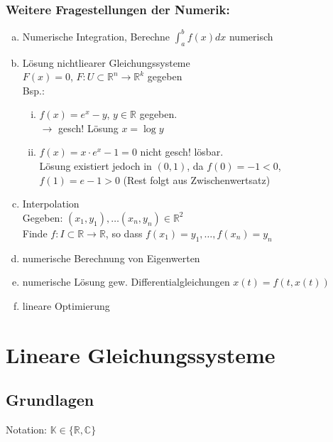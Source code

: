 \subsubsection*{Weitere Fragestellungen der Numerik:}

\begin{enumerate}[(a)]
\item
Numerische Integration, Berechne $\int_a^b f(x) dx$ numerisch
\item
Lösung nichtliearer Gleichungssysteme \\
$F(x) = 0$, $F: U \subset \mathbb{R}^n \rightarrow \mathbb{R}^k$ gegeben \\
Bsp.:
\begin{enumerate}[(i)]
\item
$f(x)=e^x-y$, $y \in \mathbb{R}$ gegeben. \\
$\rightarrow$ gesch! Lösung $x = \log y$
\item
$f(x)=x \cdot e^x -1 = 0$ nicht gesch! lösbar. \\
Lösung existiert jedoch in $(0,1)$, da $f(0) = -1 < 0$, \\
$f(1)= e-1>0 $ (Rest folgt aus Zwischenwertsatz)
\end{enumerate}
\item
Interpolation \\
Gegeben: $(x_1,y_1), \dots (x_n,y_n) \in \mathbb{R}^2$\\
Finde $f: I \subset \mathbb{R} \rightarrow \mathbb{R}$, so dass
$f(x_1) = y_1, \dots , f(x_n)=y_n$
\item
numerische Berechnung von Eigenwerten
\item
numerische Lösung gew. Differentialgleichungen $x(t)=f(t,x(t))$
\item
lineare Optimierung
\end{enumerate}

\section{Lineare Gleichungssysteme}
\subsection{Grundlagen}
Notation: $\mathbb{K} \in \{\mathbb{R}, \mathbb{C}\}$ \\

